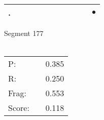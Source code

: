 \documentclass[landscape]{article}
\newcommand{\ssp}{\hspace{2pt}}
\newcommand{\mex}{\cellcolor{g}$\bullet$}
\begin{document}
\begin{tabular}{|l|p{10pt}|p{10pt}|p{10pt}|p{10pt}|p{10pt}|p{10pt}|p{10pt}|p{10pt}|p{10pt}|p{10pt}|}
\hline
\ssp \cellcolor{ref9}. \ssp&\hspace{2pt}&\hspace{2pt}&\hspace{2pt}&\hspace{2pt}&\hspace{2pt}&\hspace{2pt}&\hspace{2pt}&\hspace{2pt}&\hspace{2pt}&\hspace{2pt}\mex\\
\hline
\end{tabular}

\vspace{6pt}
\noindent Segment 177\\\\
\noindent\begin{tabular}{lm{12pt}r}
\hline
P:&&0.385\\
R:&&0.250\\
Frag:&&0.553\\
Score:&&0.118\\
\end{tabular}

\newpage
\end{document}
